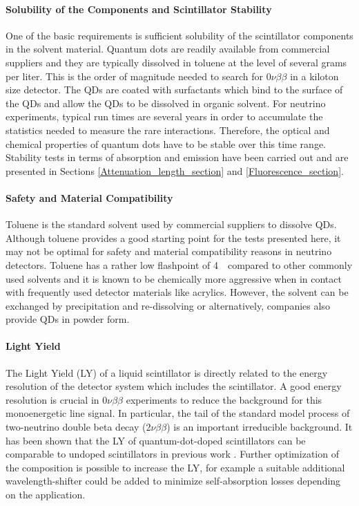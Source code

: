 \documentclass[cits]{JINST}
\begin{document}
\paragraph{Solubility of the Components and Scintillator Stability}
One of the basic requirements is sufficient solubility of the scintillator components in the solvent material. Quantum dots are readily available from commercial suppliers and they are typically dissolved in toluene at the level of several grams per liter. This is the order of magnitude needed to search for 0$\nu\beta\beta$ in a kiloton size detector. The QDs are coated with surfactants which bind to the surface of the QDs and allow the QDs to be dissolved in organic solvent. For neutrino experiments, typical run times are several years in order to accumulate the statistics needed to measure the rare interactions. Therefore, the optical and chemical properties of quantum dots have to be stable over this time range. Stability tests in terms of absorption and emission have been carried out and are presented in Sections \ref{Attenuation_length_section} and \ref{Fluorescence_section}.

\paragraph{Safety and Material Compatibility}
Toluene is the standard solvent used by commercial suppliers to dissolve QDs. Although toluene provides a good starting point for the tests presented here, it may not be optimal for safety and material compatibility reasons in neutrino detectors. Toluene has a rather low flashpoint of 4~\textcelsius ~compared to other commonly used solvents \cite{yeh2007} and it is known to be chemically more aggressive when in contact with frequently used detector materials like acrylics. However, the solvent can be exchanged by precipitation and re-dissolving or alternatively, companies also provide QDs in powder form. 

\paragraph{Light Yield} 
The Light Yield (LY) of a liquid scintillator is directly related to the energy resolution of the detector system which includes the scintillator. A good energy resolution is crucial in 0$\nu\beta\beta$ experiments to reduce the background for this monoenergetic line signal. In particular, the tail of the standard model process of two-neutrino double beta decay (2$\nu\beta\beta$) is an important irreducible background. It has been shown that the LY of quantum-dot-doped scintillators can be comparable to undoped scintillators in previous work \cite{mitpaper}. Further optimization of the composition is possible to increase the LY, for example a suitable additional wavelength-shifter could be added to minimize self-absorption losses depending on the application.
\end{document}
